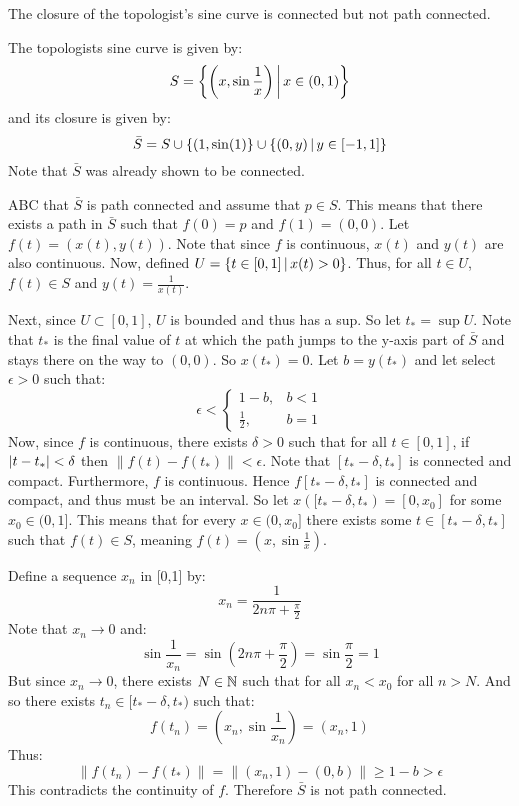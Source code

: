 \documentclass[letterpaper,12pt,fleqn]{article}
\newcommand{\e}{\epsilon}
\renewcommand{\d}{\delta}
\newcommand{\norm}[1]{\left\lVert{#1}\right\rVert}
\begin{document}
\begin{example}
  The closure of the topologist's sine curve is connected but not path connected.

  The topologists sine curve is given by:
  \[S=\left\{{\left(x,\sin\frac{1}{x}\right)}\,\middle|\,{x\in(0,1)}\right\}\]
  and its closure is given by:
  \[\bar{S}=S\cup\{(1,\sin(1)\}\cup\left\{{(0,y)}\,\middle|\,{y\in[-1,1]}\right\}\]
  Note that \(\bar{S}\) was already shown to be connected.

  ABC that \(\bar{S}\) is path connected and assume that \(p\in S\).  This means that there exists a path in
  \(\bar{S}\) such that \(f(0)=p\) and \(f(1)=(0,0)\).  Let \(f(t)=(x(t),y(t))\).  Note that since \(f\) is
  continuous, \(x(t)\) and \(y(t)\) are also continuous.  Now, defined \(U=\left\{{t\in[0,1]}\,\middle|\,{x(t)>0}\right\}\).  Thus,
  for all \(t\in U\), \(f(t)\in S\) and \(y(t)=\frac{1}{x(t)}\).

  Next, since \(U\subset[0,1]\), \(U\) is bounded and thus has a sup.  So let \(t_*=\sup U\).  Note that \(t_*\)
  is the final value of \(t\) at which the path jumps to the y-axis part of \(\bar{S}\) and stays there on the
  way to \((0,0)\).  So \(x(t_*)=0\).  Let \(b=y(t_*)\) and let select \(\e>0\) such that:
  \[\e<\begin{cases}
  1-b, & b<1 \\
  \frac{1}{2}, & b=1
  \end{cases}\]
  Now, since \(f\) is continuous, there exists \(\d>0\) such that for all \(t\in[0,1]\), if \(\abs{t-t_*}<\d\)
  then \(\norm{f(t)-f(t_*)}<\e\).  Note that \([t_*-\d,t_*]\) is connected and compact.  Furthermore, \(f\) is
  continuous.  Hence \(f[t_*-\d,t_*]\) is connected and compact, and thus must be an interval.  So let
  \(x([t_*-\d,t_*)=[0,x_0]\) for some \(x_0\in(0,1]\).  This means that for every \(x\in(0,x_0]\) there exists
  some \(t\in[t_*-\d,t_*]\) such that \(f(t)\in S\), meaning \(f(t)=(x,\sin\frac{1}{x})\).

  Define a sequence \(x_n\) in [0,1] by:
  \[x_n=\frac{1}{2n\pi+\frac{\pi}{2}}\]
  Note that \(x_n\to0\) and:
  \[\sin\frac{1}{x_n}=\sin\left(2n\pi+\frac{\pi}{2}\right)=\sin\frac{\pi}{2}=1\]
  But since \(x_n\to 0\), there exists \(N\in\mathbb{N}\) such that for all \(x_n<x_0\) for all \(n>N\).  And so there
  exists \(t_n\in[t_*-\d,t_*)\) such that:
  \[f(t_n)=\left(x_n,\sin\frac{1}{x_n}\right)=(x_n,1)\]
  Thus:
  \[\norm{f(t_n)-f(t_*)}=\norm{(x_n,1)-(0,b)}\ge1-b>\e\]
  This contradicts the continuity of \(f\).  Therefore \(\bar{S}\) is not path connected.
\end{example}
\end{document}
